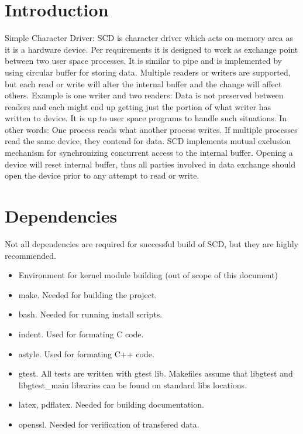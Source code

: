 \documentclass[11pt]{report}
\begin{document}
\section{Introduction}
Simple Character Driver: SCD is character driver which acts on memory area as it is a hardware device. Per requirements it is designed to work as exchange point between two user space processes. It is similar to pipe and is implemented by using circular buffer for storing data. Multiple readers or writers are supported, but each read or write will alter the internal buffer and the change will affect others. Example is one writer and two readers: Data is not preserved between readers and each might end up getting just the portion of what writer has written to device. It is up to user space programs to handle such situations. In other words: One process reads what another process writes. If multiple processes read the same device, they contend for data. SCD implements mutual exclusion mechanism for synchronizing concurrent access to the internal buffer. Opening a device will reset internal buffer, thus all parties involved in data exchange should open the device prior to any attempt to read or write. 

\section{Dependencies}
Not all dependencies are required for successful build of SCD, but they are highly recommended.
\begin{itemize}
\item Environment for kernel module building (out of scope of this document)
\item make. Needed for building the project.
\item bash. Needed for running install scripts.
\item indent. Used for formating C code.
\item astyle. Used for formating C++ code.
\item gtest. All tests are written with gtest lib. Makefiles assume that libgtest and libgtest\_main libraries can be found on standard libs locations.
\item latex, pdflatex. Needed for building documentation.
\item openssl. Needed for verification of transfered data.
\end{itemize}
\end{document}
